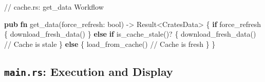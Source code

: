 \documentclass[
  letterpaper,
  DIV=11,
  numbers=noendperiod]{scrreprt}
\newenvironment{Shaded}{\begin{snugshade}}{\end{snugshade}}
\newcommand{\CommentTok}[1]{\textcolor[rgb]{0.37,0.37,0.37}{#1}}
\newcommand{\ControlFlowTok}[1]{\textcolor[rgb]{0.00,0.23,0.31}{\textbf{#1}}}
\newcommand{\DataTypeTok}[1]{\textcolor[rgb]{0.68,0.00,0.00}{#1}}
\newcommand{\KeywordTok}[1]{\textcolor[rgb]{0.00,0.23,0.31}{\textbf{#1}}}
\newcommand{\NormalTok}[1]{\textcolor[rgb]{0.00,0.23,0.31}{#1}}
\newcommand{\OperatorTok}[1]{\textcolor[rgb]{0.37,0.37,0.37}{#1}}
\begin{document}
\begin{Shaded}
\begin{Highlighting}[]
\CommentTok{// cache.rs: get\_data Workflow}

\KeywordTok{pub} \KeywordTok{fn}\NormalTok{ get\_data(force\_refresh}\OperatorTok{:} \DataTypeTok{bool}\NormalTok{) }\OperatorTok{{-}\textgreater{}} \DataTypeTok{Result}\OperatorTok{\textless{}}\NormalTok{CratesData}\OperatorTok{\textgreater{}} \OperatorTok{\{}
    \ControlFlowTok{if}\NormalTok{ force\_refresh }\OperatorTok{\{}
\NormalTok{        download\_fresh\_data()}
    \OperatorTok{\}} \ControlFlowTok{else} \ControlFlowTok{if}\NormalTok{ is\_cache\_stale()}\OperatorTok{?} \OperatorTok{\{}
\NormalTok{        download\_fresh\_data() }\CommentTok{// Cache is stale}
    \OperatorTok{\}} \ControlFlowTok{else} \OperatorTok{\{}
\NormalTok{        load\_from\_cache() }\CommentTok{// Cache is fresh}
    \OperatorTok{\}}
\OperatorTok{\}}
\end{Highlighting}
\end{Shaded}

\subsection{\texorpdfstring{\texttt{main.rs}: Execution and
Display}{main.rs: Execution and Display}}\label{main.rs-execution-and-display}
\end{document}
